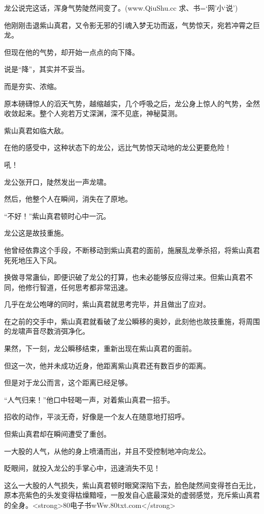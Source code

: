 
\begin{this_body}

龙公说完这话，浑身气势陡然间变了。(www.QiuShu.cc 求、书=‘网’小‘说’)

他刚刚击退紫山真君，又令影无邪的引魂入梦无功而返，气势惊天，宛若冲霄之巨龙。

但现在他的气势，却开始一点点的向下降。

说是“降”，其实并不妥当。

而是夯实、浓缩。

原本磅礴惊人的滔天气势，越缩越实，几个呼吸之后，龙公身上惊人的气势，全然收敛起来。整个人宛若万丈深渊，深不见底，神秘莫测。

紫山真君如临大敌。

在他的感受中，这种状态下的龙公，远比气势惊天动地的龙公更要危险！

吼！

龙公张开口，陡然发出一声龙啸。

然后，他整个人在瞬间，消失在了原地。

“不好！”紫山真君顿时心中一沉。

龙公这是故技重施。

他曾经依靠这个手段，不断移动到紫山真君的面前，施展乱龙拳杀招，将紫山真君死死地压入下风。

换做寻常蛊仙，即便识破了龙公的打算，也未必能够反应得过来。但紫山真君不同，他修行智道，任何思考都非常迅速。

几乎在龙公咆哮的同时，紫山真君就思考完毕，并且做出了应对。

在之前的交手中，紫山真君就看破了龙公瞬移的奥妙，此刻他也故技重施，将周围的龙啸声音尽数消弭净化。

果然，下一刻，龙公瞬移结束，重新出现在紫山真君的面前。

但这一次，他并未成功近身，他距离紫山真君还有数百步的距离。

但是对于龙公而言，这个距离已经足够。

“人气归来！”他口中轻喝一声，对着紫山真君一招手。

招收的动作，平淡无奇，好像是一个友人在随意地打招呼。

但紫山真君却在瞬间遭受了重创。

一大股的人气，从他的身上喷涌而出，并且不受控制地冲向龙公。

眨眼间，就投入龙公的手掌心中，迅速消失不见！

这么一大股的人气损失，紫山真君顿时眼窝深陷下去，脸色陡然间变得苍白无比，原本亮紫色的头发变得枯燥黯哑，一股发自心底最深处的虚弱感觉，充斥紫山真君的全身。<strong>80电子书wWw.80txt.com</strong>


\end{this_body}
